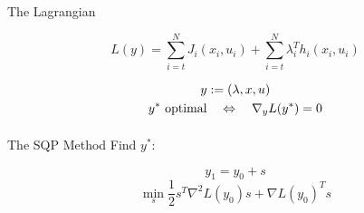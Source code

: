 

\begin{frame}{The Lagrangian}
\begin{block}{ }
\[  L(y) =   \sum\limits_{i=t}^{N} J_{i}(x_{i},u_{i})
  + \sum\limits_{i=t}^{N} \lambda_{i}^{T} h_i (x_i ,u_i ) \]
\end{block}
\begin{gather*}
	y := (\lambda,x,u) \\
	\vspace{1ex}
	y^* \text{ optimal} \quad \Leftrightarrow \quad \nabla_{y} L(y^*)  = 0
\end{gather*}

\end{frame}

%	
%	
%		
%		
%	

\begin{frame}{The SQP Method}
Find $y^*$:
\begin{block}{ }
\[ y_{1} = y_{0} + s \]
\[\min_{s}  \frac{1}{2} s^T \nabla^2 L(y_0) s + \nabla L(y_0)^T s \]
\end{block}
\hfill
\centering


\end{frame}

